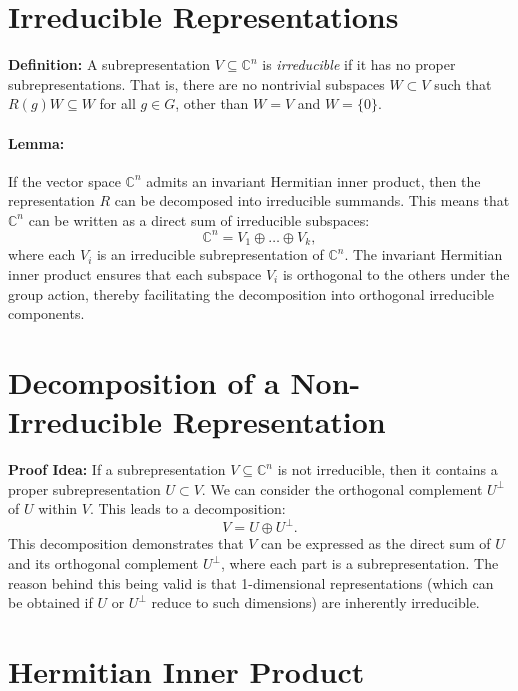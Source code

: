 \documentclass{article}
\begin{document}
\section*{Irreducible Representations}

\textbf{Definition:} A subrepresentation \( V \subseteq \mathbb{C}^n \) is \textit{irreducible} if it has no proper subrepresentations. That is, there are no nontrivial subspaces \( W \subset V \) such that \( R(g) W \subseteq W \) for all \( g \in G \), other than \( W = V \) and \( W = \{0\} \).

\paragraph{Lemma:} If the vector space \( \mathbb{C}^n \) admits an invariant Hermitian inner product, then the representation \( R \) can be decomposed into irreducible summands. This means that \( \mathbb{C}^n \) can be written as a direct sum of irreducible subspaces:
\[
\mathbb{C}^n = V_1 \oplus \dots \oplus V_k,
\]
where each \( V_i \) is an irreducible subrepresentation of \( \mathbb{C}^n \). The invariant Hermitian inner product ensures that each subspace \( V_i \) is orthogonal to the others under the group action, thereby facilitating the decomposition into orthogonal irreducible components.

\section*{Decomposition of a Non-Irreducible Representation}

\textbf{Proof Idea:} If a subrepresentation \( V \subseteq \mathbb{C}^n \) is not irreducible, then it contains a proper subrepresentation \( U \subset V \). We can consider the orthogonal complement \( U^\perp \) of \( U \) within \( V \). This leads to a decomposition:
\[
V = U \oplus U^\perp.
\]
This decomposition demonstrates that \( V \) can be expressed as the direct sum of \( U \) and its orthogonal complement \( U^\perp \), where each part is a subrepresentation. The reason behind this being valid is that 1-dimensional representations (which can be obtained if \( U \) or \( U^\perp \) reduce to such dimensions) are inherently irreducible.

\section*{Hermitian Inner Product}
\end{document}
